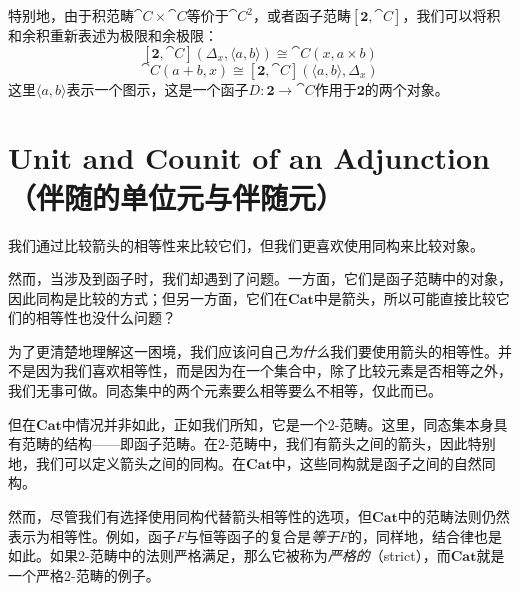 \documentclass[DaoFP]{subfiles}
\begin{document}
    特别地，由于积范畴$\cat C \times \cat C$等价于$\cat C^2$，或者函子范畴$[\mathbf{2}, \cat C]$，我们可以将积和余积重新表述为极限和余极限：
    \[ [\mathbf{2}, \cat C](\Delta_x, \langle a, b \rangle) \cong \cat C(x, a \times b) \]
    \[ \cat C( a + b, x) \cong [\mathbf{2}, \cat C]( \langle a, b \rangle, \Delta_x) \]
    这里$\langle a, b \rangle$表示一个图示，这是一个函子$D \colon \mathbf{2} \to \cat C$作用于$\mathbf{2}$的两个对象。

    \section{Unit and Counit of an Adjunction（伴随的单位元与伴随元）}

    我们通过比较箭头的相等性来比较它们，但我们更喜欢使用同构来比较对象。

    然而，当涉及到函子时，我们却遇到了问题。一方面，它们是函子范畴中的对象，因此同构是比较的方式；但另一方面，它们在$\mathbf{Cat}$中是箭头，所以可能直接比较它们的相等性也没什么问题？

    为了更清楚地理解这一困境，我们应该问自己\emph{为什么}我们要使用箭头的相等性。并不是因为我们喜欢相等性，而是因为在一个集合中，除了比较元素是否相等之外，我们无事可做。同态集中的两个元素要么相等要么不相等，仅此而已。

    但在$\mathbf{Cat}$中情况并非如此，正如我们所知，它是一个$2$-范畴。这里，同态集本身具有范畴的结构——即函子范畴。在$2$-范畴中，我们有箭头之间的箭头，因此特别地，我们可以定义箭头之间的同构。在$\mathbf{Cat}$中，这些同构就是函子之间的自然同构。

    然而，尽管我们有选择使用同构代替箭头相等性的选项，但$\mathbf{Cat}$中的范畴法则仍然表示为相等性。例如，函子$F$与恒等函子的复合是\emph{等于}$F$的，同样地，结合律也是如此。如果$2$-范畴中的法则严格满足，那么它被称为\emph{严格的}（strict），而$\mathbf{Cat}$就是一个严格$2$-范畴的例子。
\end{document}
